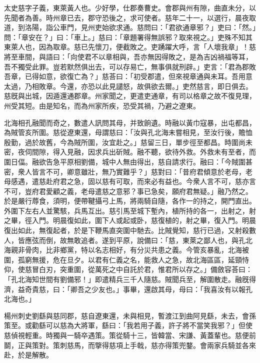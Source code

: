 
\begin{pinyinscope}
太史慈字子義，東萊黃人也。少好學，仕郡奏曹史。會郡與州有隙，曲直未分，以先聞者為善。時州章已去，郡守恐後之，求可使者。慈年二十一，以選行，晨夜取道，到洛陽，詣公車門，見州吏始欲求通。慈問曰：「君欲通章邪？」吏曰：「然。」問：「章安在？」曰：「車上。」慈曰：「章題署得無誤邪？取來視之。」吏殊不知其東萊人也，因為取章。慈已先懷刀，便截敗之。吏踴躍大呼，言「人壞我章」！慈將至車間，與語曰：「向使君不以章相與，吾亦無因得敗之，是為吉凶禍福等耳，吾不獨受此罪。豈若默然俱出去，可以存易亡，無事俱就刑辟。」吏言：「君為郡敗吾章，已得如意，欲復亡為？」慈荅曰：「初受郡遣，但來視章通與未耳。吾用意太過，乃相敗章。今還，亦恐以此見譴怒，故俱欲去爾。」吏然慈言，即日俱去。慈旣與出城，因遁還通郡章。州家聞之，更遣吏通章，有司以格章之故不復見理，州受其短。由是知名，而為州家所疾，恐受其禍，乃避之遼東。

北海相孔融聞而奇之，數遣人訊問其母，并致餉遺。時融以黃巾寇暴，出屯都昌，為賊管亥所圍。慈從遼東還，母謂慈曰：「汝與孔北海未嘗相見，至汝行後，贍恤殷勤，過於故舊，今為賊所圍，汝宜赴之。」慈留三日，單步徑至都昌。時圍尚未密，夜伺間隙，得入見融，因求兵出斫賊。融不聽，欲待外救。外救未有至者，而圍日偪。融欲告急平原相劉備，城中人無由得出，慈自請求行。融曰：「今賊圍甚密，衆人皆言不可，卿意雖壯，無乃實難乎？」慈對曰：「昔府君傾意於老母，老母感遇，遣慈赴府君之急，固以慈有可取，而來必有益也。今衆人言不可，慈亦言不可，豈府君愛顧之義，老母遣慈之意邪？事已急矣，願府君無疑。」融乃然之。於是嚴行蓐食，須明，便帶鞬攝弓上馬，將兩騎自隨，各作一的持之，開門直出。外圍下左右人並驚駭，兵馬互出。慈引馬至城下塹內，植所持的各一，出射之，射之畢，徑入門。明晨復如此，圍下人或起或卧，慈復植的，射之畢，復入門。明晨復出如此，無復起者，於是下鞭馬直突圍中馳去。比賊覺知，慈行已過，又射殺數人，皆應弦而倒，故無敢追者。遂到平原，說備曰：「慈，東萊之鄙人也，與孔北海親非骨肉，比非鄉黨，特以名志相好，有分災共患之義。今管亥暴亂，北海被圍，孤窮無援，危在旦夕。以君有仁義之名，能救人之急，故北海區區，延頸恃仰，使慈冒白刃，突重圍，從萬死之中自託於君，惟君所以存之。」備斂容荅曰：「孔北海知世間有劉備邪！」即遣精兵三千人隨慈。賊聞兵至，解圍散走。融旣得濟，益奇貴慈，曰：「卿吾之少友也。」事畢，還啟其母，母曰：「我喜汝有以報孔北海也。」

楊州刺史劉繇與慈同郡，慈自遼東還，未與相見，暫渡江到曲阿見繇，未去，會孫策至。或勸繇可以慈為大將軍，繇曰：「我若用子義，許子將不當笑我邪？」但使慈偵視輕重。時獨與一騎卒遇策。策從騎十三，皆韓當、宋謙、黃蓋輩也。慈便前鬬，正與策對。策刺慈馬，而擥得慈項上手戟，慈亦得策兜鍪。會兩家兵騎並各來赴，於是解散。


\end{pinyinscope}
